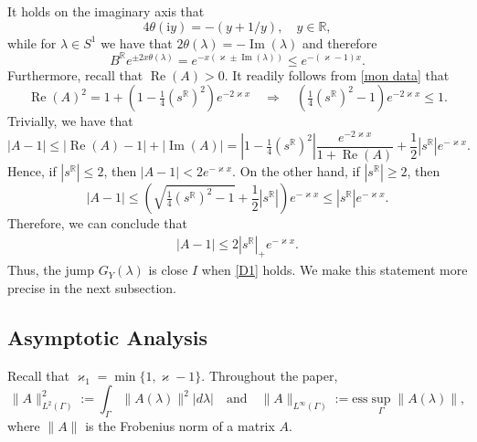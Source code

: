 \documentclass[a4paper,10pt,leqno]{amsart}
\numberwithin{equation}{subsection}
\theoremstyle{plain}
\theoremstyle{definition}
\theoremstyle{remark}
\theoremstyle{case}
\newcommand{\R}{\mathbb R}
\newcommand{\ii}{\mathrm{i}}
\renewcommand{\Re}{\operatorname{Re}}
\renewcommand{\Im}{\operatorname{Im}}
\begin{document}
It holds on the imaginary axis that
\begin{equation}
\label{theta on imaginary}
4\theta(\ii y)=-(y+1/y), \quad y\in\R,
\end{equation}
while for \( \lambda\in S^1 \) we have that \( 2\theta(\lambda) =-\Im(\lambda)\) and therefore
\begin{equation}
\label{B is almost small}
B^\R e^{\pm2x\theta(\lambda)} = e^{-x(\varkappa\pm\Im(\lambda))} \leq e^{-(\varkappa-1)x}.
\end{equation}
Furthermore, recall that \( \Re(A)>0 \). It readily follows from \eqref{mon data} that
\[
\Re(A)^2 = 1 + \left(1 - \tfrac 14(s^\R)^2\right)e^{-2\varkappa x} \quad \Rightarrow \quad \left(\tfrac 14(s^\R)^2-1\right)e^{-2\varkappa x}\leq 1.
\]
Trivially, we have that
\[
|A-1| \leq |\Re(A)-1| + |\Im(A)| = \left|1 - \tfrac 14(s^\R)^2\right| \frac{e^{-2\varkappa x}}{1+\Re(A)} + \frac12 |s^\R|e^{-\varkappa x}.
\]
Hence, if \( |s^\R|\leq 2 \), then \( |A-1|< 2e^{-\varkappa x} \). On the other hand, if \( |s^\R|\geq 2 \), then
\[
|A-1| \leq \left(\sqrt{\tfrac 14(s^\R)^2-1}+\frac12 |s^\R|\right)e^{-\varkappa x} \leq |s^\R| e^{-\varkappa x}.
\]
Therefore, we can conclude that
\begin{align}
\label{A is almost 1}
|A-1| \leq 2|s^\R|_+ e^{-\varkappa x}.
\end{align}
Thus, the jump \( G_Y(\lambda) \) is close \( I \) when \eqref{D1} holds. We make this statement more precise in the next subsection.


\subsection{Asymptotic Analysis} 
\label{AAI}

Recall that \( \varkappa_1=\min\{1,\varkappa-1\}\). Throughout the paper,
\[
\|A\|_{L^2(\Gamma)}^2 := \int_{\Gamma}\|A(\lambda)\|^2|d\lambda| \quad \text{and} \quad  \|A\|_{L^\infty(\Gamma)} := \mathrm{ess}\sup_{\Gamma}\|A(\lambda)\|,
\]
where \( \|A\| \) is the Frobenius norm of a matrix \( A \).
\end{document}
